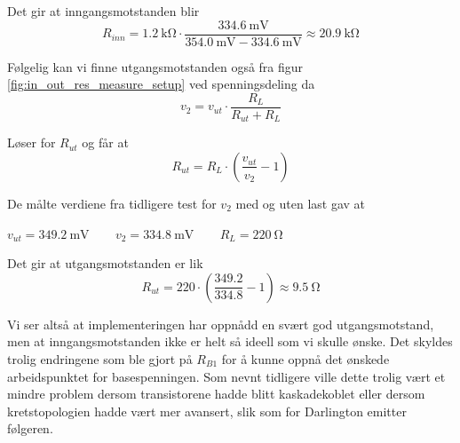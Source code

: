Det gir at inngangsmotstanden blir
\[
    R_{inn} = \SI{1.2}{\kilo\ohm} \cdot \frac{\SI{334.6}{\milli\volt}}{\SI{354.0}{\milli\volt} - \SI{334.6}{\milli\volt}} \approx \SI{20.9}{\kilo\ohm}
\]

Følgelig kan vi finne utgangsmotstanden også fra figur \ref{fig:in_out_res_measure_setup} ved spenningsdeling 
da 
\[
    v_2 = v_{ut} \cdot \frac{R_L}{R_{ut} + R_L}
\]

Løser for $R_{ut}$ og får at 
\[
    R_{ut} = R_L \cdot \left(\frac{v_{ut}}{v_2} - 1\right)
\]

De målte verdiene fra tidligere test for $v_2$ med og uten last gav at 
\begin{center}
    $v_{ut} = \SI{349.2}{\milli\volt}\:\:\:\:$ $\:\:\:\:v_{2} = \SI{334.8}{\milli\volt}\:\:\:\:$ $\:\:\:\:R_L = \SI{220}{\ohm}$
\end{center}

Det gir at utgangsmotstanden er lik 
\[
    R_{ut} = 220 \cdot \left(\frac{349.2}{334.8} - 1\right) \approx \SI{9.5}{\ohm}
\]

Vi ser altså at implementeringen har oppnådd en svært god utgangsmotstand, men at inngangsmotstanden 
ikke er helt så ideell som vi skulle ønske. Det skyldes trolig endringene som ble gjort på $R_{B1}$ 
for å kunne oppnå det ønskede arbeidspunktet for basespenningen. Som nevnt tidligere 
ville dette trolig vært et mindre problem dersom transistorene hadde blitt kaskadekoblet eller dersom 
kretstopologien hadde vært mer avansert, slik som for Darlington emitter følgeren.

